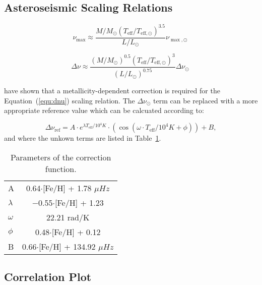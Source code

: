 \subsection{Asteroseismic Scaling Relations}


\begin{equation}
\nu_{\max} \approx \frac{ M/M_{\odot}(T_{\text{eff}}/T_{\text{eff},\odot})^{3.5}}{L/L_{\odot}} \nu_{\max,\odot} \: 
\label{equ:nmax}
\end{equation}

\begin{equation}
\Delta\nu \approx \frac{(M/M_{\odot})^{0.5}(T_{\text{eff}}/T_{\text{eff},\odot})^{3}}{(L/L_{\odot})^{0.75}}
\Delta\nu_{\odot} \: 
\label{equ:dnu}
\end{equation}

\citet{2016MNRAS.460.4277G} have shown that a metallicity-dependent correction is required for the Equation~(\ref{equ:dnu}) scaling relation.
The ${\Delta\nu_{\odot}}$ term can be replaced with a more appropriate reference value which can be calcuated according to:


\begin{equation}
\Delta\nu_{\text{ref}}= A \cdot e^{\lambda T_{\text{eff}}/10^4K} \cdot (\cos(\omega \cdot T_{\text{eff}}/10^4K+\phi))+B,
\label{eq:corrfunc2}
\end{equation}
and where the unkown terms are listed in Table~\ref{tab:pars2}. 

 
\begin{table}
	\centering
	\caption{Parameters of the correction function.}
	\label{tab:pars2}
	\begin{tabular}{lc} %
		\hline
		A & 0.64$\cdot$[Fe/H] + 1.78  $\mu Hz$ \\
		$\lambda$ & $-$0.55$\cdot$[Fe/H] + 1.23  \\
		$\omega$ & 22.21 rad/K \\
		$\phi$ & 0.48$\cdot$[Fe/H] + 0.12 \\
		B & 0.66$\cdot$[Fe/H] + 134.92 $\mu Hz$ \\
		\hline
	\end{tabular}
\end{table}




\subsection{Correlation Plot} 
\label{sec:fullcorr}



